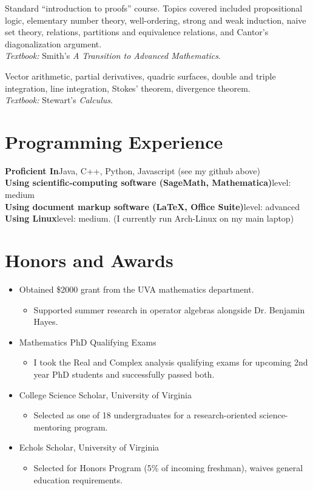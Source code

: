 \documentclass[11pt,letterpaper,sans]{moderncv}
\begin{document}
%
  {Standard ``introduction to proofs'' course. Topics covered included propositional logic, elementary number theory, well-ordering, strong and weak induction, naive set theory, relations, partitions and equivalence relations, and Cantor's diagonalization argument. \\ \emph{Textbook: }Smith's \emph{A Transition to Advanced Mathematics}.}

%
  {Vector arithmetic, partial derivatives, quadric surfaces, double and triple integration, line integration, Stokes' theorem, divergence theorem. \\ \emph{Textbook: }Stewart's \emph{Calculus}.}


\section{Programming Experience}
\textbf{Proficient In}\quad Java, C++, Python, Javascript (see my github above) \\
\textbf{Using scientific-computing software (SageMath, Mathematica)}\quad level: medium \\
\textbf{Using document markup software (\LaTeX, Office Suite)}\quad level: advanced \\
\textbf{Using Linux}\quad level: medium. (I currently run Arch-Linux on my main laptop)


\section{Honors and Awards}
\begin{itemize}
  \item Obtained \$2000 grant from the UVA mathematics department.
  \begin{itemize}
    \item Supported summer research in operator algebras alongside Dr. Benjamin Hayes.
  \end{itemize}
  \item Mathematics PhD Qualifying Exams
  \begin{itemize}
    \item I took the Real and Complex analysis qualifying exams for upcoming 2nd year PhD students and successfully passed both.
  \end{itemize}
  \item College Science Scholar, University of Virginia
  \begin{itemize}
    \item Selected as one of 18 undergraduates for a research-oriented science-mentoring program.
  \end{itemize}
  \item Echols Scholar, University of Virginia
  \begin{itemize}
    \item Selected for Honors Program (5\% of incoming freshman), waives general education requirements.
  \end{itemize}
\end{itemize}
\end{document}
